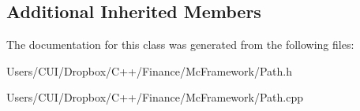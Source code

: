 \subsection*{Additional Inherited Members}


The documentation for this class was generated from the following files\+:\begin{DoxyCompactItemize}
\item 
Users/\+C\+U\+I/\+Dropbox/\+C++/\+Finance/\+Mc\+Framework/Path.\+h\item 
Users/\+C\+U\+I/\+Dropbox/\+C++/\+Finance/\+Mc\+Framework/Path.\+cpp\end{DoxyCompactItemize}
